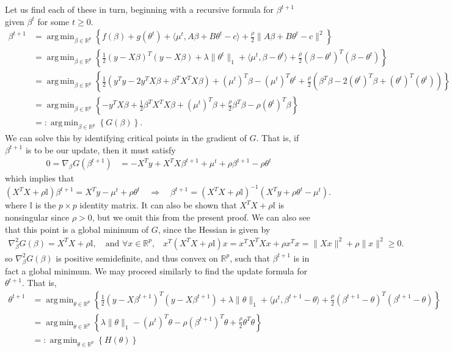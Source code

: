 \documentclass[10pt]{article}
\newcommand{\mbb}[1]{\mathbb{#1}}
\newcommand{\1}[1]{\mathbbm{1}_{#1}}
\DeclareMathOperator{\argmin}{arg\,min}
\begin{document}
    Let us find each of these in turn, beginning with a recursive formula for $\beta^{t+1}$ given $\beta^t$ for some $t\geq 0$.
    \begin{align*}
        \beta^{t+1}&=\argmin_{\beta\in\mbb{R}^p} \left\{f(\beta)+g(\theta^t)+\langle\mu^t, A\beta+B\theta^t-c\rangle+\tfrac{\rho}{2}\|A\beta+B\theta^t-c\|^2\right\}\\
        &=\argmin_{\beta\in\mbb{R}^p} \left\{\frac{1}{2}(y-X\beta)^T(y-X\beta)+\lambda\|\theta^t\|_1+\langle\mu^t,\beta-\theta^t\rangle+\tfrac{\rho}{2}(\beta-\theta^t)^T(\beta-\theta^t)\right\}\\
        &=\argmin_{\beta\in\mbb{R}^p} \left\{\frac{1}{2}(y^Ty-2y^TX\beta+\beta^TX^TX\beta)+(\mu^t)^T\beta-(\mu^t)^T\theta^t+\frac{\rho}{2}(\beta^T\beta-2(\theta^t)^T\beta+(\theta^t)^T(\theta^t))\right\}\\
        &=\argmin_{\beta\in\mbb{R}^p} \left\{-y^TX\beta+\frac{1}{2}\beta^TX^TX\beta+(\mu^t)^T\beta+\frac{\rho}{2}\beta^T\beta-\rho(\theta^t)^T\beta\right\}\\
        &=:\argmin_{\beta\in\mbb{R}^p} \left\{G(\beta)\right\}.
    \end{align*}
We can solve this by identifying critical points in the gradient of $G$. That is, if $\beta^{t+1}$ is to be our update, then it must satisfy
\begin{align*}
    0=\nabla_\beta G(\beta^{t+1})&=-X^Ty+X^TX\beta^{t+1}+\mu^t+\rho\beta^{t+1}-\rho\theta^t
\end{align*}
which implies that
\[(X^TX+\rho\mbb{I})\beta^{t+1}=X^Ty-\mu^t+\rho\theta^t\quad\Rightarrow\quad\beta^{t+1}=(X^TX+\rho\mbb{{I}})^{-1}(X^Ty+\rho\theta^t-\mu^t).\]
where $\mbb{I}$ is the $p\times p$ identity matrix. It can also be shown that $X^TX+\rho\mbb{I}$ is nonsingular since $\rho>0$, but we omit this from the present proof.
We can also see that this point is a global minimum of $G$, since the Hessian is given by
\begin{align*}
    \nabla^2_\beta G(\beta)=X^TX+\rho\mbb{I},\quad\text{and $\forall x\in\mbb{R}^p$,}\quad x^T(X^TX+\rho\mbb{I})x=x^TX^TXx+\rho x^Tx=\|Xx\|^2+\rho\|x\|^2\geq 0.
\end{align*}
so $\nabla^2_\beta G(\beta)$ is positive semidefinite, and thus convex on $\mbb{R}^p$, such that $\beta^{t+1}$ is in fact a global minimum. We may proceed similarly to find the update formula for $\theta^{t+1}$. That is,
\begin{align*}
    \theta^{t+1}&=\argmin_{\theta\in\mbb{R}^p}\left\{\frac{1}{2}(y-X\beta^{t+1})^T(y-X\beta^{t+1})+\lambda\|\theta\|_1+\langle\mu^t,\beta^{t+1}-\theta\rangle+\tfrac{\rho}{2}(\beta^{t+1}-\theta)^T(\beta^{t+1}-\theta)\right\}\\
    &=\argmin_{\theta\in\mbb{R}^p}\left\{\lambda\|\theta\|_1-(\mu^t)^T\theta-\rho(\beta^{t+1})^T\theta+\frac{\rho}{2}\theta^T\theta\right\}\tag{4}\\
    &=:\argmin_{\theta\in\mbb{R}^p}\left\{H(\theta)\right\}
\end{align*}
\end{document}
